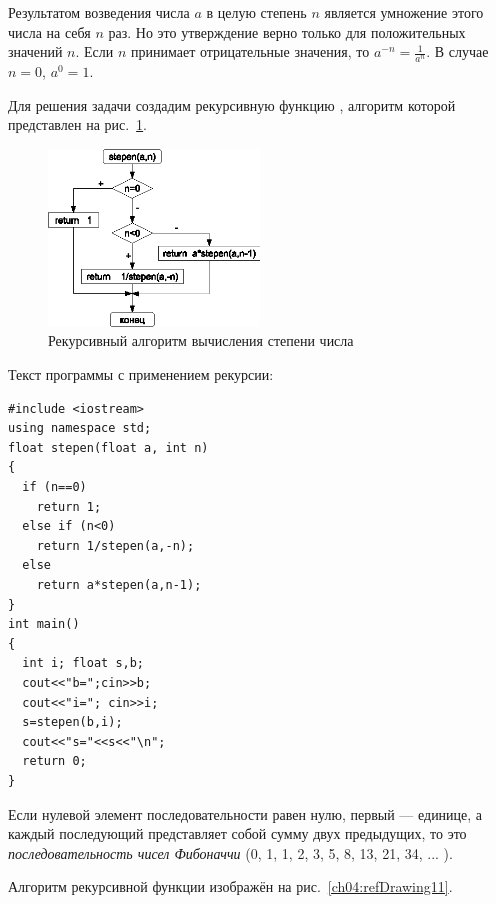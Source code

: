
Результатом возведения числа $a$ в целую степень $n$ является умножение этого числа
на себя $n$ раз. Но это утверждение верно только для положительных значений $n$.
Если $n$ принимает отрицательные значения, то  $a^{-n}=\frac{1}{a^n}$. В случае
$n=0$,  $a^0=1$.

Для решения задачи создадим рекурсивную функцию , алгоритм которой 
представлен на рис.~\ref{ch04:refDrawing10}. 

\begin{figure}[htb]
\begin{center}
\includegraphics[width=0.5\textwidth]{img/ris_4_11}
\caption{Рекурсивный алгоритм вычисления степени числа}
\label{ch04:refDrawing10}
\end{center}
\end{figure}

Текст программы с применением рекурсии:
\begin{lstlisting}
#include <iostream> 
using namespace std;
float stepen(float a, int n) 
{
  if (n==0)
    return 1;
  else if (n<0) 
    return 1/stepen(a,-n); 
  else
    return a*stepen(a,n-1); 
}
int main()
{
  int i; float s,b;
  cout<<"b=";cin>>b;
  cout<<"i="; cin>>i;
  s=stepen(b,i);
  cout<<"s="<<s<<"\n"; 
  return 0;
}
\end{lstlisting}


Если нулевой элемент последовательности равен нулю, первый --- единице, а каждый последующий представляет собой сумму двух
предыдущих, то это \emph{последовательность чисел Фибоначчи} (0, 1, 1, 2, 3, 5, 8, 13, 21, 34, ... ). 

Алгоритм рекурсивной функции  изображён на рис.~\ref{ch04:refDrawing11}.


